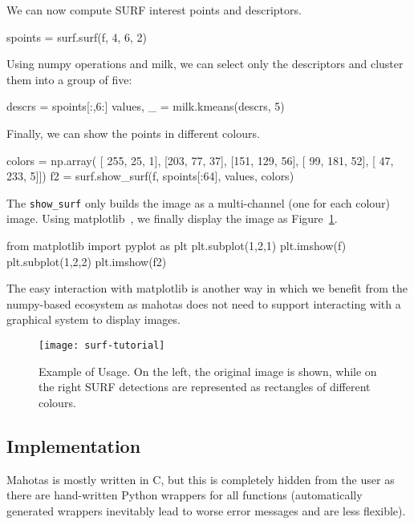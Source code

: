 \documentclass{scrartcl}
\newcommand*{\cpp}{{C\nolinebreak[4]\hspace{-.05em}\raisebox{.4ex}{\tiny\textbf{++}}}}
\begin{document}
We can now compute SURF interest points and descriptors.
\begin{python}
spoints = surf.surf(f, 4, 6, 2)
\end{python}

Using numpy operations and milk, we can select only the descriptors and cluster
them into a group of five:

\begin{python}
descrs = spoints[:,6:]
values, _ = milk.kmeans(descrs, 5)
\end{python}

Finally, we can show the points in different colours.
\begin{python}
colors = np.array(
    [ 255,  25,   1],
    [203,  77,  37],
    [151, 129,  56],
    [ 99, 181,  52],
    [ 47, 233,   5]])
f2 = surf.show_surf(f, spoints[:64], values, colors)
\end{python}

The \texttt{show\_surf} only builds the image as a multi-channel (one for each
colour) image. Using matplotlib~\citep{10.1109/MCSE.2007.55}, we finally
display the image as Figure~\ref{fig:surf}.

\begin{python}
from matplotlib import pyplot as plt
plt.subplot(1,2,1)
plt.imshow(f)
plt.subplot(1,2,2)
plt.imshow(f2)
\end{python}

The easy interaction with matplotlib is another way in which we benefit from
the numpy-based ecosystem as mahotas does not need to support interacting with
a graphical system to display images.

\begin{figure}
\begin{center}
\texttt{[image: surf-tutorial]}
\end{center}
\caption{Example of Usage. On the left, the original image is shown, while on
the right SURF detections are represented as rectangles of different colours.}
\label{fig:surf}
\end{figure}

\subsection{Implementation}

Mahotas is mostly written in \cpp, but this is completely hidden from the user
as there are hand-written Python wrappers for all functions (automatically
generated wrappers inevitably lead to worse error messages and are less
flexible).
\end{document}
